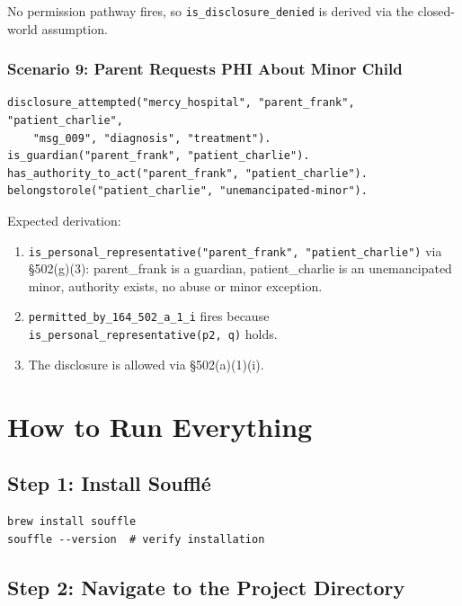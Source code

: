 \documentclass[11pt,letterpaper]{article}
\begin{document}
No permission pathway fires, so \texttt{is\_disclosure\_denied} is derived via the closed-world assumption.

\subsubsection{Scenario 9: Parent Requests PHI About Minor Child}

\begin{lstlisting}[style=soufflestyle,caption={Scenario 9 facts}]
disclosure_attempted("mercy_hospital", "parent_frank", "patient_charlie",
    "msg_009", "diagnosis", "treatment").
is_guardian("parent_frank", "patient_charlie").
has_authority_to_act("parent_frank", "patient_charlie").
belongstorole("patient_charlie", "unemancipated-minor").
\end{lstlisting}

Expected derivation:
\begin{enumerate}
  \item \texttt{is\_personal\_representative("parent\_frank", "patient\_charlie")} via \S 502(g)(3): parent\_frank is a guardian, patient\_charlie is an unemancipated minor, authority exists, no abuse or minor exception.
  \item \texttt{permitted\_by\_164\_502\_a\_1\_i} fires because \texttt{is\_personal\_representative(p2, q)} holds.
  \item The disclosure is allowed via \S 502(a)(1)(i).
\end{enumerate}


\section{How to Run Everything}
\label{sec:running}

\subsection{Step 1: Install Souffl\'{e}}

\begin{lstlisting}[style=bashstyle]
brew install souffle
souffle --version  # verify installation
\end{lstlisting}

\subsection{Step 2: Navigate to the Project Directory}
\end{document}
